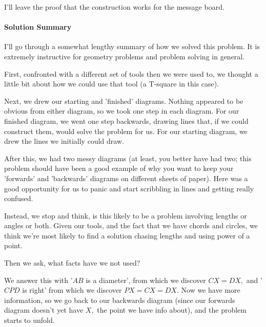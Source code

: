 
I'll leave the proof that the construction works for the message board.

\paragraph{Solution Summary}
I'll go through a somewhat lengthy summary of how we solved this problem. It is extremely instructive for geometry problems and problem solving in general.

First, confronted with a different set of tools then we were used to, we thought a little bit about how we could use that tool (a T-square in this case).

Next, we drew our starting and 'finished' diagrams. Nothing appeared to be obvious from either diagram, so we took one step in each diagram. For our finished diagram, we went one step backwards, drawing lines that, if we could construct them, would solve the problem for us. For our starting diagram, we drew the lines we initially could draw.

After this, we had two messy diagrams (at least, you better have had two; this problem should have been a good example of why you want to keep your 'forwards' and 'backwards' diagrams on different sheets of paper). Here was a good opportunity for us to panic and start scribbling in lines and getting really confused.

Instead, we stop and think, is this likely to be a problem involving lengths or angles or both. Given our tools, and the fact that we have chords and circles, we think we're most likely to find a solution chasing lengths and using power of a point.

Then we ask, what facts have we not used?

We answer this with '$AB$ is a diameter', from which we discover $CX = DX,$ and '$CPD$ is right' from which we discover $PX = CX = DX.$ Now we have more information, so we go back to our backwards diagram (since our forwards diagram doesn't yet have $X,$ the point we have info about), and the problem starts to unfold.

